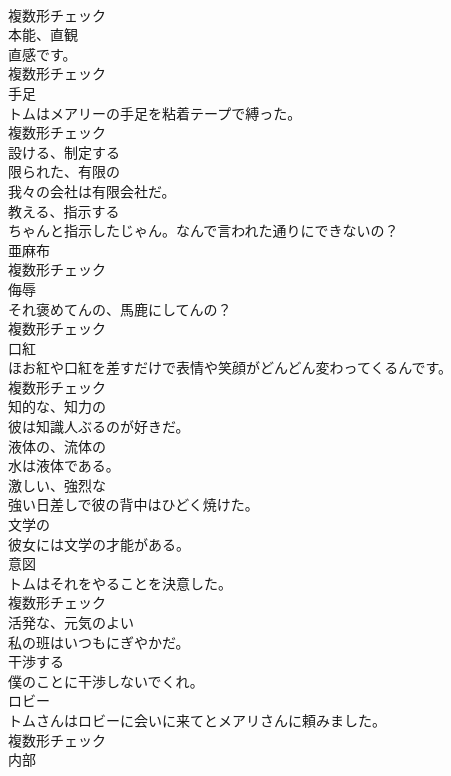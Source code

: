 \documentclass[8pt]{extreport}
\begin{document}
\begin{CJK}{UTF8}{min}
\\	複数形チェック
\\	[名詞]	本能、直観	
\\	直感です。	
\\	複数形チェック
\\	[名詞]	手足	
\\	トムはメアリーの手足を粘着テープで縛った。	
\\	複数形チェック
\\	[動詞]	設ける、制定する	
\\	[形容詞]	限られた、有限の	
\\	我々の会社は有限会社だ。	
\\	[動詞]	教える、指示する	
\\	ちゃんと指示したじゃん。なんで言われた通りにできないの？	
\\	[名詞]	亜麻布	
\\	複数形チェック
\\	[名詞]	侮辱	
\\	それ褒めてんの、馬鹿にしてんの？	
\\	複数形チェック
\\	[名詞]	口紅	
\\	ほお紅や口紅を差すだけで表情や笑顔がどんどん変わってくるんです。	
\\	複数形チェック
\\	[形容詞]	知的な、知力の	
\\	彼は知識人ぶるのが好きだ。	
\\	[形容詞]	液体の、流体の	
\\	水は液体である。	
\\	[形容詞]	激しい、強烈な	
\\	強い日差しで彼の背中はひどく焼けた。	
\\	[形容詞]	文学の	
\\	彼女には文学の才能がある。	
\\	[名詞]	意図	
\\	トムはそれをやることを決意した。	
\\	複数形チェック
\\	[形容詞]	活発な、元気のよい	
\\	私の班はいつもにぎやかだ。	
\\	[動詞]	干渉する	
\\	僕のことに干渉しないでくれ。	
\\	[名詞]	ロビー	
\\	トムさんはロビーに会いに来てとメアリさんに頼みました。	
\\	複数形チェック
\\	[名詞]	内部	

\end{CJK}
\end{document}
